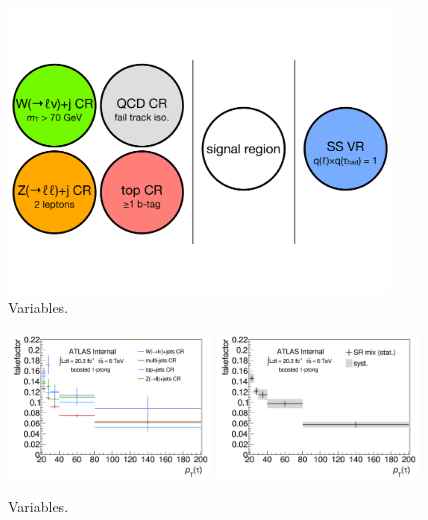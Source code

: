 \begin{figure}[tp]
  \centering
  \includegraphics[width=0.90\textwidth]{figures/backgrounds/regions-cartoon}
  \caption{Variables.}
  \label{fig:backgrounds-regions}
\end{figure}

\begin{figure}[tp]
  \centering
  \includegraphics[width=0.48\textwidth]{figures/backgrounds/fakefactor_8TeV_boosted_1p_CRs}
  \includegraphics[width=0.48\textwidth]{figures/backgrounds/fakefactor_8TeV_boosted_1p_mix}
  \caption{Variables.}
  \label{fig:backgrounds-fakefactorsboost1p}
\end{figure}

